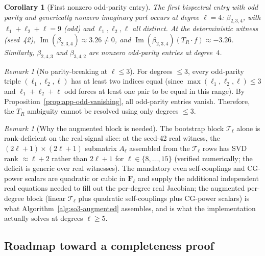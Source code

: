 \documentclass{article}
\newtheorem{corollary}[theorem]{Corollary}
\theoremstyle{definition}
\theoremstyle{remark}
\newtheorem{remark}[theorem]{Remark}
\DeclareMathOperator{\im}{Im}
\theoremstyle{definition}
\begin{document}
\begin{corollary}[First nonzero odd-parity entry]\label{cor:app-first-odd}
The first bispectral entry with odd parity and generically nonzero imaginary
part occurs at degree $\ell = 4$:
$\beta_{2,3,4}$, with
$\ell_1+\ell_2+\ell = 9$ (odd) and
$\ell_1, \ell_2, \ell$ all distinct.
At the deterministic witness (seed~42), $\im(\beta_{2,3,4}) \approx 3.26 \ne 0$,
and $\im(\beta_{2,3,4})(T_R \cdot f) \approx -3.26$.
Similarly, $\beta_{2,4,3}$ and $\beta_{3,4,2}$ are nonzero odd-parity entries
at degree~$4$.
\end{corollary}

\begin{remark}[No parity-breaking at $\ell \le 3$]\label{rem:app-no-parity-breaking-le3}
For degrees $\le 3$, every odd-parity triple $(\ell_1,\ell_2,\ell)$
has at least two indices equal (since $\max(\ell_1,\ell_2,\ell) \le 3$
and $\ell_1+\ell_2+\ell$ odd forces at least one pair to be equal in this range).
By Proposition~\ref{prop:app-odd-vanishing}, all odd-parity entries vanish.
Therefore, the $T_R$ ambiguity cannot be resolved using only degrees $\le 3$.
\end{remark}

\begin{remark}[Why the augmented block is needed]
\label{rem:app-Tell-rank-deficit}
The bootstrap block $\mathcal{T}_\ell$ alone is rank-deficient on the
real-signal slice: at the seed-42 real witness, the
$(2\ell{+}1)\times(2\ell{+}1)$ submatrix $A_\ell$ assembled from the
$\mathcal{T}_\ell$ rows has SVD rank
$\approx \ell{+}2$ rather than $2\ell{+}1$ for $\ell\in\{8,\dots,15\}$
(verified numerically; the deficit is generic over real witnesses).
The mandatory even self-couplings and CG-power scalars are quadratic
or cubic in $\mathbf{F}_\ell$ and supply the additional independent
real equations needed to fill out the per-degree real Jacobian; the
augmented per-degree block (linear $\mathcal{T}_\ell$ plus quadratic
self-couplings plus CG-power scalars) is what
Algorithm~\ref{alg:so3-augmented} assembles, and is what the
implementation actually solves at degrees $\ell\ge 5$.
\end{remark}

\subsection{Roadmap toward a completeness proof}
\label{sec:app-proof-roadmap}
\end{document}
